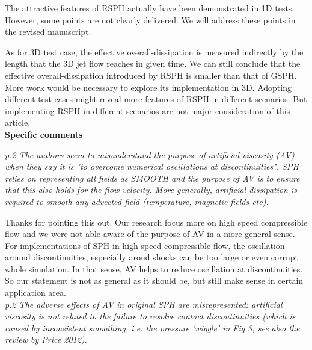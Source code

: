 \documentclass[10pt,a4paper]{article}
\begin{document}
The attractive features of RSPH actually have been demonstrated in 1D tests. However, some points are not clearly delivered. We will address these points in the revised manuscript.

As for 3D test case, the effective overall-dissipation is measured indirectly by the length that the 3D jet flow reaches in given time. We can still conclude that the effective overall-dissipation introduced by RSPH is smaller than that of GSPH. More work would be necessary to explore its implementation in 3D. Adopting different test cases might reveal more features of RSPH in different scenarios. But implementing RSPH in different scenarios are not major consideration of this article.
\\[12pt]

\textbf{\large Specific comments}

\textit{p.2 The authors seem to misunderstand the purpose of artificial viscosity (AV) when they say it is "to overcome numerical oscillations at
discontinuities". SPH relies on representing all fields as SMOOTH and the purpose of AV is to ensure that this also holds for the flow velocity.
More generally, artificial dissipation is required to smooth any advected field (temperature, magnetic fields etc).}

Thanks for pointing this out. Our research focus more on high speed compressible flow and we were not able aware of the purpose of AV in a more general sense. For implementations of SPH in high speed compressible flow, the oscillation around discontinuities, especially aroud shocks can be too large or even corrupt whole simulation. In that sense, AV helps to reduce oscillation at discontinuities. So our statement is not as general as it should be, but still make sense in certain application area.
\\[3pt]

\textit{p.2 The adverse effects of AV in original SPH are misrepresented: artificial viscosity is not related to the failure to resolve contact discontinuities (which is caused by inconsistent smoothing, i.e. the pressure 'wiggle' in Fig 3, see also the review by Price 2012).}
\end{document}
